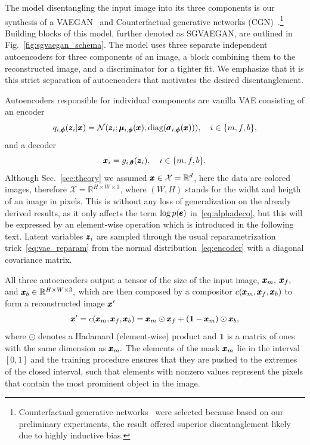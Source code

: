The model disentangling the input image into its three components is our synthesis of a VAEGAN~\cite{larsen2016autoencoding} and Counterfactual generative networks (CGN)~\cite{sauer2021counterfactual}.\footnote{Counterfactual generative networks~\cite{sauer2021counterfactual} were selected because based on our preliminary experiments, the result offered superior disentanglement likely due to highly inductive bias.} Building blocks of this model, further denoted as SGVAEGAN, are outlined in Fig.~\ref{fig:sgvaegan_schema}. The model uses three separate independent autoencoders for three components of an image, a block combining them to the reconstructed image, and a discriminator for a tighter fit. We emphasize that it is this strict separation of autoencoders that motivates the desired disentanglement.

Autoencoders responsible for individual components are vanilla VAE consisting of an encoder
\begin{equation} \label{eq:encoder}
    q_{i,\vc{\phi}}(\vc{z}_i \vert \vc{x}) = \mathcal{N} \left(\vc{z}_i; \vc{\mu}_{i,\vc{\phi}}(\vc{x}), \text{diag}(\vc{\sigma}_{i,\vc{\phi}}(\vc{x})) \right), \quad i \in \lbrace m, f, b \rbrace,
\end{equation}
 and a decoder 
\begin{equation} \label{eq:decoder}
    \pmb{{x}}_i = g_{i,\pmb{{\theta}}} (\pmb{{z}}_i),\quad i \in \lbrace m, f, b \rbrace.
\end{equation}
Although Sec.~\ref{sec:theory} we assumed $\pmb{{x}} \in \mathcal{X} = \mathbb{R}^d$, here the data are colored images, therefore $\mathcal{X} = \mathbb{R}^{H \times W \times 3}$, where $(W,H)$ stands for the widht and heigth of an image in pixels. This is without any loss of generalization on the already derived results, as it only affects the term $\log p(\pmb{{e}})$ in~\eqref{eq:alphadeco}, but this will be expressed by an element-wise operation which is introduced in the following text. Latent variables $\pmb{{z}}_i$ are sampled through the usual reparametrization trick~\eqref{eq:vae_reparam} from the normal distribution~\eqref{eq:encoder} with a diagonal covariance matrix.

All three autoencoders output a tensor of the size of the input image, $\pmb{{x}}_m,$ $\pmb{{x}}_f,$ and $\pmb{{x}}_b \in \mathbb{R}^{H \times W \times 3},$ which are then composed by a compositor $c(\pmb{{x}}_m,\pmb{{x}}_f,\pmb{{x}}_b)$ to form a reconstructed image $\pmb{{x}}'$
\begin{equation}
    \pmb{{x}}' = c(\pmb{{x}}_m,\pmb{{x}}_f,\pmb{{x}}_b) = \pmb{{x}}_m \odot \pmb{{x}}_f + (\mathbf{1} - \pmb{{x}}_m) \odot \pmb{{x}}_b, \label{eq:composition}
\end{equation}
where $\odot$ denotes a Hadamard (element-wise) product and $\mathbf{1}$ is a matrix of ones with the same dimension as $\pmb{{x}}_m.$ The elements of the mask $\pmb{{x}}_m$ lie in the interval $[0,1]$ and the training procedure ensures that they are pushed to the extremes of the closed interval, such that elements with nonzero values represent the pixels that contain the most prominent object in the image. 

